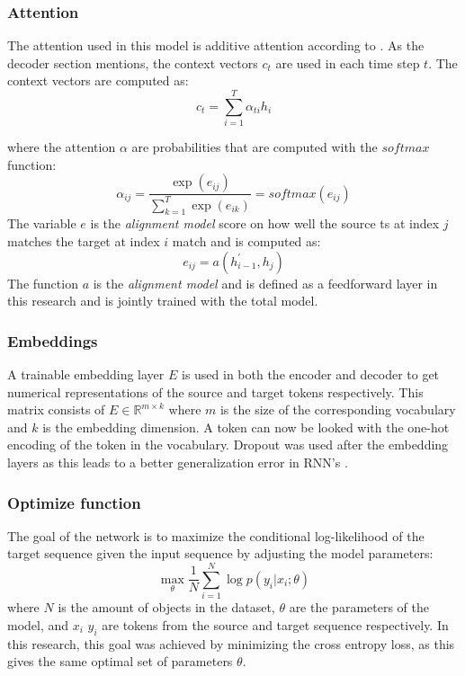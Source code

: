 \subsubsection{Attention}
The attention used in this model is additive attention according to \citeauthor{bahdanau2014neural}. As the decoder section mentions, the context vectors $c_{t}$ are used in each time step $t$. The context vectors are computed as:
$$
c_{t}=\sum_{i=1}^{T} \alpha_{t i} h_{i}
$$

where the attention $\alpha$ are probabilities that are computed with the $softmax$ function:
$$
\alpha_{i j}=\frac{\exp \left(e_{i j}\right)}{\sum_{k=1}^{T} \exp \left(e_{i k}\right)} = softmax(e_{ij})
$$
The variable $e$ is the \textit{alignment model} score on how well the source ts at index $j$ matches the target at index $i$ match and is computed as:  
$$
e_{i j}=a\left(h^{\prime}_{i-1}, h_{j}\right)
$$
The function $a$ is the \textit{alignment model} and is defined as a feedforward layer in this research and is jointly trained with the total model.

\subsubsection{Embeddings}
A trainable embedding layer $E$ is used in both the encoder and decoder to get numerical representations of the source and target tokens respectively. This matrix consists of $E \in \mathbb{R}^{m \times k}$ where $m$ is the size of the corresponding vocabulary and $k$ is the embedding dimension. A token can now be looked with the one-hot encoding of the token in the vocabulary. Dropout was used after the embedding layers as this leads to a better generalization error in RNN's \cite{gal2016theoretically}.  

\subsubsection{Optimize function}
The goal of the network is to maximize the conditional log-likelihood of the target sequence given the input sequence by adjusting the model parameters:
$$
\max _{\theta} \frac{1}{N} \sum_{i=1}^{N} \log p\left(y_{i} | x_{i} ; \theta\right)
$$
where $N$ is the amount of objects in the dataset, $\theta$ are the parameters of the model, and $x_i$ $y_i$ are tokens from the source and target sequence respectively. In this research, this goal was achieved by minimizing the cross entropy loss, as this gives the same optimal set of parameters $\theta$. 

